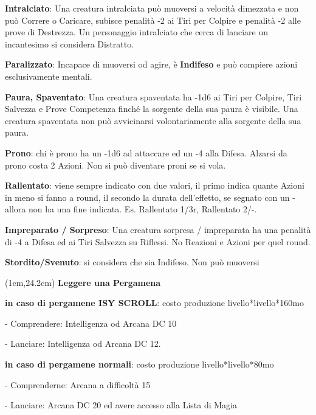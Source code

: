 \documentclass[a4paper,12 pt,openany]{book}
\begin{document}
\begin{textblock*}{19 cm}
\begin{multicols}{2}
\textbf{Intralciato}: Una creatura intralciata può muoversi a velocità dimezzata e non può Correre o Caricare, subisce penalità -2 ai Tiri per Colpire e penalità -2 alle prove di Destrezza. Un personaggio intralciato che cerca di lanciare un incantesimo si considera Distratto.

\textbf{Paralizzato}:  Incapace di muoversi od agire, è \textbf{Indifeso} e può compiere azioni esclusivamente mentali.

\textbf{Paura, Spaventato}: Una creatura spaventata ha -1d6 ai Tiri per Colpire, Tiri Salvezza e Prove Competenza finché la sorgente della sua paura è visibile. Una creatura spaventata non può avvicinarsi volontariamente alla sorgente della sua paura.

\textbf{Prono}: chi è prono ha un -1d6 ad attaccare ed un -4 alla Difesa. Alzarsi da prono costa 2 Azioni. Non si può diventare proni se si vola.

\textbf{Rallentato}: viene sempre indicato con due valori, il primo indica quante Azioni in meno si fanno a round, il secondo la durata dell'effetto, se segnato con un - allora non ha una fine indicata. Es. Rallentato 1/3r, Rallentato 2/-.

\textbf{Impreparato / Sorpreso}: 
Una creatura sorpresa / impreparata ha una penalità di -4 a Difesa ed ai Tiri Salvezza su Riflessi. No Reazioni e Azioni per quel round.

\textbf{Stordito/Svenuto}: si considera che sia Indifeso. Non può muoversi

\end{multicols}

\end{textblock*}


\begin{textblock*}{14 cm}(1cm,24.2cm)
\textbf{Leggere una Pergamena}

\textbf{in caso di pergamene ISY SCROLL}: costo produzione livello*livello*160mo

- Comprendere: Intelligenza od Arcana DC 10

- Lanciare: Intelligenza od Arcana DC 12.

\textbf{in caso di pergamene normali}: costo produzione livello*livello*80mo

- Comprenderne: Arcana a difficoltà 15

- Lanciare: Arcana DC 20 ed avere accesso alla Lista di Magia
\end{textblock*}
\end{document}
